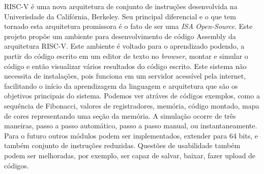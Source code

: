 RISC-V é uma nova arquitetura de conjunto de instruções desenvolvida na Univerisdade da Califórnia, Berkeley. Seu principal diferencial e o que tem tornado esta arquitetura promissora é o fato de ser uma \textit{ISA} \textit{Open-Source}. Este projeto propõe um ambiente para desenvolvimento de código Assembly da arquitetura RISC-V. Este ambiente é voltado para o aprendizado podendo, a partir do código escrito em um editor de texto no \textit{browser}, montar e simular o código e então visualizar vários resultados do código escrito. Este sistema não necessita de instalações, pois funciona em um servidor acessível pela internet, facilitando o início da aprendizagem da linguagem e arquitetura que são os objetivos principais do sistema. Podemos ver atráves de códigos exemplos, como a sequência de Fibonacci, valores de registradores, memória, código montado, mapa de cores representando uma seção da memória. A simulação ocorre de três maneiras, passo a passo automático, passo a passo manual, ou instantaneamente. Para o futuro outros módulos podem ser implementados, extender para 64 bits, e também conjunto de instruções reduzidas. Questões de usabilidade também podem ser melhoradas, por exemplo, ser capaz de salvar, baixar, fazer upload de códigos.